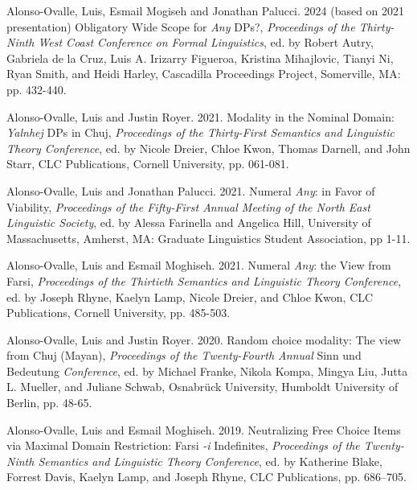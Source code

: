 \documentclass[11pt]{article}
\begin{document}
Alonso-Ovalle, Luis, Esmail Mogiseh and Jonathan Palucci. 2024 (based on 2021 presentation) Obligatory Wide Scope for \textit{Any} DPs?, \textit{Proceedings of the Thirty-Ninth West Coast Conference on Formal Linguistics}, ed. by Robert Autry, Gabriela de la Cruz, Luis A. Irizarry Figueroa, Kristina Mihajlovic, Tianyi Ni, Ryan Smith, and Heidi Harley, Cascadilla Proceedings Project, Somerville, MA: pp. 432-440.


Alonso-Ovalle, Luis and Justin Royer. 2021. Modality in the Nominal Domain: \textit{Yalnhej} DPs in Chuj, \textit{Proceedings of the Thirty-First Semantics and Linguistic Theory Conference}, ed. by Nicole Dreier, Chloe Kwon, Thomas Darnell, and John Starr, CLC Publications, Cornell University, pp. 061-081.

Alonso-Ovalle, Luis and Jonathan Palucci. 2021. Numeral \textit{Any}: in Favor of Viability, \textit{Proceedings of the Fifty-First Annual Meeting of the North East Linguistic Society}, ed. by Alessa Farinella and Angelica Hill, University of Massachusetts, Amherst, MA: Graduate Linguistics Student Association, pp 1-11.

 Alonso-Ovalle, Luis and Esmail Moghiseh. 2021. Numeral \textit{Any}: the View from Farsi, \textit{Proceedings of the Thirtieth Semantics and Linguistic Theory Conference}, ed. by Joseph Rhyne, Kaelyn Lamp, Nicole Dreier, and Chloe Kwon, CLC Publications, Cornell University, pp. 485-503. %
      
    Alonso-Ovalle, Luis and Justin Royer. 2020. Random choice modality: The view from Chuj (Mayan), \textit{Proceedings of the Twenty-Fourth Annual} Sinn und Bedeutung \textit{Conference}, ed. by Michael Franke, Nikola Kompa, Mingya Liu, Jutta L. Mueller, and Juliane Schwab, Osnabr\"{u}ck University, Humboldt University of Berlin, pp. 48-65. 
    
      Alonso-Ovalle, Luis and Esmail Moghiseh. 2019. Neutralizing Free Choice Items via Maximal Domain
Restriction: Farsi \textit{-i} Indefinites, \textit{Proceedings of the Twenty-Ninth Semantics and Linguistic Theory Conference}, ed. by Katherine Blake, Forrest Davis, Kaelyn Lamp, and Joseph Rhyne, CLC Publications, pp. 686–705. 
      
\end{document}
